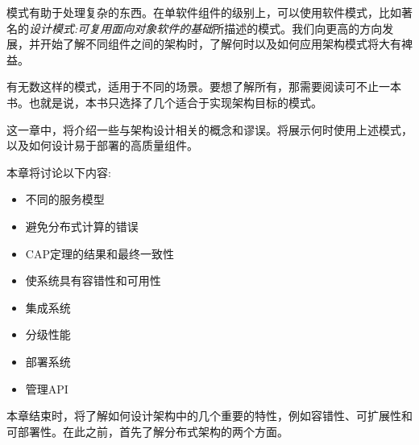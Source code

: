 
模式有助于处理复杂的东西。在单软件组件的级别上，可以使用软件模式，比如著名的\textit{设计模式:可复用面向对象软件的基础}所描述的模式。我们向更高的方向发展，并开始了解不同组件之间的架构时，了解何时以及如何应用架构模式将大有裨益。

有无数这样的模式，适用于不同的场景。要想了解所有，那需要阅读可不止一本书。也就是说，本书只选择了几个适合于实现架构目标的模式。

这一章中，将介绍一些与架构设计相关的概念和谬误。将展示何时使用上述模式，以及如何设计易于部署的高质量组件。

本章将讨论以下内容:

\begin{itemize}
\item 不同的服务模型
\item 避免分布式计算的错误
\item CAP定理的结果和最终一致性
\item 使系统具有容错性和可用性
\item 集成系统
\item 分级性能
\item 部署系统
\item 管理API
\end{itemize}

本章结束时，将了解如何设计架构中的几个重要的特性，例如容错性、可扩展性和可部署性。在此之前，首先了解分布式架构的两个方面。



























